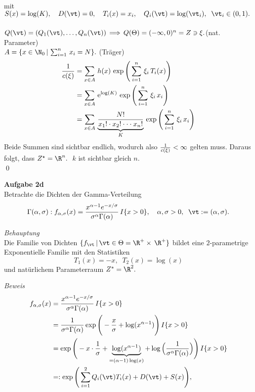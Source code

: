 \documentclass[12pt]{article}
\begin{document}
\begin{description}
{\begin{equation*}
\begin{split}
        \end{split}\end{equation*} mit \quad$S(x) = \log(K), \quad D(\vt) = 0, \quad T_i(x) = x_i,\quad Q_i(\vt) = \log(\vt_i), \;\;\vt_i \in (0,1).$ \\\\
         $Q(\vt) = (Q_1(\vt), .\,.\,.\,, Q_n(\vt)) \,\Longrightarrow \, Q(\Theta) = (-\infty, 0)^n = Z \ni \xi.$\qquad(nat. Parameter) \\ $A = \{x \in \N_0 \, | \, \sum_{i=1}^n \,x_i = N\}.$ \qquad(Träger) 
        \begin{equation*}\begin{split} {1 \over c(\xi)} &= \sum_{x \in A} \,h(x) \, \exp\Bigg(\sum_{i = 1}^n \,\xi_i \, T_i (x)\Bigg) \\&= \sum_{x \in A} \,{\rm e}^{\log(K)} \, \exp\Bigg(\sum_{i = 1}^n \,\xi_i \, x_i\Bigg) \\&= \sum_{x \in A} \, \underbrace{\frac{N!}{x_1! \cdot x_2! \cdot \cdot \cdot x_n!}}_{ K} \, \exp\Bigg(\sum_{i = 1}^n \,\xi_i \, x_i\Bigg) 
        \end{split}\end{equation*} Beide Summen sind sichtbar endlich, wodurch also ${1 \over c(\xi)} < \infty$ gelten muss. Daraus folgt, dass $Z^\star = \R^n. \;$ $k$ ist sichtbar gleich $n$. \\\xtab\qed
        }
        \item{\textbf{Aufgabe 2d}\\ Betrachte die Dichten der Gamma-Verteilung $$\Gamma(\alpha,\sigma): f_{\alpha,\sigma} (x) = \frac{x^{\alpha -1}e^{-x/\sigma}}{\sigma^\alpha \Gamma(\alpha)} \,I\{x > 0\},\quad \alpha, \sigma > 0, \;\;\vt := (\alpha,\sigma).$$ 
        }
                \item{\textit{Behauptung} \\ Die Familie von Dichten $\{f_{\vt}\,|\,\vt\in\Theta = \R^+ \times \,\R^+ \}$ bildet eine $2$-parametrige Exponentielle Familie mit den Statistiken $$T_1 (x) = -x, \;\; T_2 (x) = \log(x)$$
        und natürlichem Parameterraum $Z^* = \R^2.$
        }
        \item{\textit{Beweis} 
        \begin{equation*}\begin{split}
                f_{\alpha,\sigma} (x) &= \frac{x^{\alpha -1}e^{-x/\sigma}}{\sigma^\alpha \Gamma(\alpha)} \,I\{x > 0\} \\&= \frac{1}{\sigma^\alpha \Gamma(\alpha)} \exp\Bigg(-\frac{x}{\sigma} + \log(x^{\alpha -1}) \Bigg)\,I\{x > 0\} \\&= \exp\Bigg(-x \cdot \frac{1}{\sigma} + \underbrace{\log(x^{\alpha -1})}_{= (\alpha - 1)\log(x)}  + \log\Big(\frac{1}{\sigma^{\alpha}\Gamma(\alpha)}\Big)  \Bigg)\,I\{x > 0\} \\&=: \exp\Bigg(\sum_{i=1}^2 Q_i(\vt)T_i(x) + D(\vt) + S(x)  \Bigg),

\end{split}
\end{equation*}}
\end{description}
\end{document}
